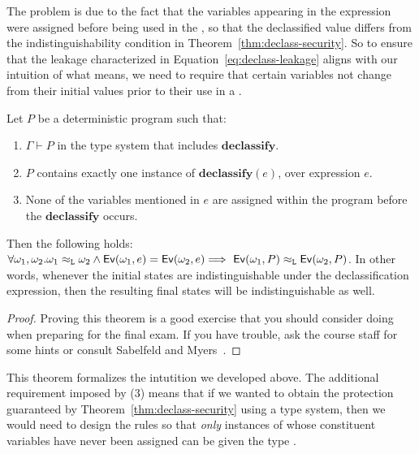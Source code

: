 \documentclass[11pt,twoside]{scrartcl}
\begin{document}
The problem is due to the fact that the \hisec variables appearing in the  expression were assigned before being used in the , so that the declassified value differs from the indistinguishability condition in Theorem~\ref{thm:declass-security}. So to ensure that the leakage characterized in Equation~\ref{eq:declass-leakage} aligns with our intuition of what  means, we need to require that certain variables not change from their initial values prior to their use in a . 

\begin{theorem}
\label{thm:declass-security}
Let $P$ be a deterministic program such that:
\begin{enumerate}
\item $\Gamma \vdash P$ in the type system that includes $\mathbf{declassify}$. 
\item $P$ contains exactly one instance of $\mathbf{declassify}(e)$, over expression $e$.
\item None of the variables mentioned in $e$ are assigned within the program before the $\mathbf{declassify}$ occurs.
\end{enumerate}
Then the following holds:
$
\forall \omega_1, \omega_2 . \omega_1 \approx_\lowsec \omega_2 \land \eval{\omega_1}{e} = \eval{\omega_2}{e} \Longrightarrow\ \eval{\omega_1}{P} \approx_\lowsec \eval{\omega_2}{P}
$.
In other words, whenever the initial states are indistinguishable under the declassification expression, then the resulting final states will be indistinguishable as well.
\end{theorem}

\begin{proof}
Proving this theorem is a good exercise that you should consider doing when preparing for the final exam. If you have trouble, ask the course staff for some hints or consult Sabelfeld and Myers~\cite{Sabelfeld04}.
\end{proof}

This theorem formalizes the intutition we developed above. The additional requirement imposed by (3) means that if we wanted to obtain the protection guaranteed by Theorem~\ref{thm:declass-security} using a type system, then we would need to design the rules so that \emph{only} instances of  whose constituent variables have never been assigned can be given the type \lowsec.



\end{document}
